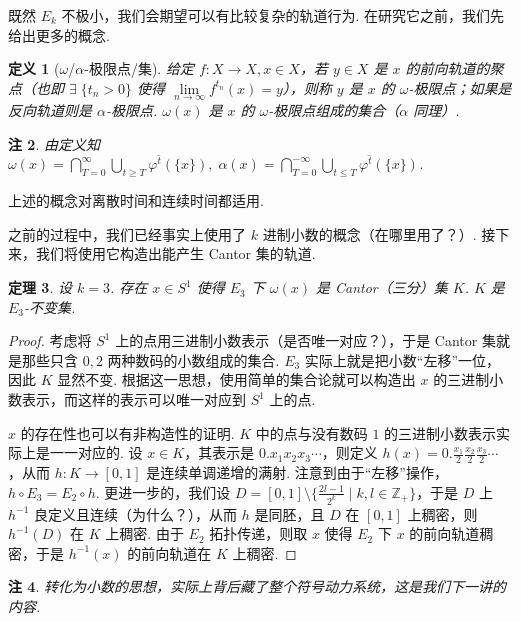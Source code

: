 \documentclass[11pt, a4paper, oneside]{ctexart}
\newtheorem{theorem}{定理}[section]
\newtheorem{definition}[theorem]{定义}
\newtheorem{remark}[theorem]{注}
\newcommand{\Z}{\mathbb{Z}}
\begin{document}
    既然 $E_k$ 不极小，我们会期望可以有比较复杂的轨道行为. 在研究它之前，我们先给出更多的概念.

    \begin{definition}[$\omega$/$\alpha$-极限点/集]
        给定 $f:X\to X,x\in X$，若 $y\in X$ 是 $x$ 的前向轨道的聚点（也即 $\exists\; \{t_n>0\}$ 使得 $\lim\limits_{n\to\infty}f^{t_n}(x)=y$），则称 $y$ 是 $x$ 的 $\omega$-极限点；如果是反向轨道则是 $\alpha$-极限点. $\omega(x)$ 是 $x$ 的 $\omega$-极限点组成的集合（$\alpha$ 同理）.
    \end{definition}
    \begin{remark}
        由定义知 $\omega(x)=\bigcap\limits_{T=0}^{\infty}\overline{\bigcup\limits_{t\geq T}\varphi^t(\{x\})},\; \alpha(x)=\bigcap\limits_{T=0}^{-\infty}\overline{\bigcup\limits_{t\leq T}\varphi^t(\{x\})}$.
    \end{remark}
    上述的概念对离散时间和连续时间都适用.

    之前的过程中，我们已经事实上使用了 $k$ 进制小数的概念（在哪里用了？）. 接下来，我们将使用它构造出能产生 Cantor 集的轨道.
    \begin{theorem}
        设 $k=3$. 存在 $x\in S^1$ 使得 $E_3$ 下 $\omega(x)$ 是 Cantor（三分）集 $K$. $K$ 是 $E_3$-不变集.
    \end{theorem}
    \begin{proof}
        考虑将 $S^1$ 上的点用三进制小数表示（是否唯一对应？），于是 Cantor 集就是那些只含 $0,2$ 两种数码的小数组成的集合. $E_3$ 实际上就是把小数“左移”一位，因此 $K$ 显然不变. 根据这一思想，使用简单的集合论就可以构造出 $x$ 的三进制小数表示，而这样的表示可以唯一对应到 $S^1$ 上的点.
        
        $x$ 的存在性也可以有非构造性的证明. $K$ 中的点与没有数码 $1$ 的三进制小数表示实际上是一一对应的. 设 $x\in K$，其表示是 $0.x_1x_2x_3\cdots$，则定义 $h(x)=0.\frac{x_1}{2}\frac{x_2}{2}\frac{x_3}{2}\cdots$，从而 $h:K\to [0,1]$ 是连续单调递增的满射. 注意到由于“左移”操作，$h\circ E_3=E_2\circ h$. 更进一步的，我们设 $D=[0,1]\setminus\{\frac{2l-1}{2^k}\mid k,l\in\Z_{+}\}$，于是 $D$ 上 $h^{-1}$ 良定义且连续（为什么？），从而 $h$ 是同胚，且 $D$ 在 $[0,1]$ 上稠密，则 $h^{-1}(D)$ 在 $K$ 上稠密. 由于 $E_2$ 拓扑传递，则取 $x$ 使得 $E_2$ 下 $x$ 的前向轨道稠密，于是 $h^{-1}(x)$ 的前向轨道在 $K$ 上稠密.
    \end{proof}
    \begin{remark}
        转化为小数的思想，实际上背后藏了整个符号动力系统，这是我们下一讲的内容.
    \end{remark}
\end{document}

